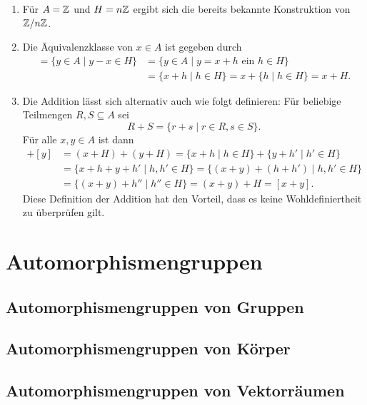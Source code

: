 \begin{bem}
 \begin{enumerate}[leftmargin=*]
  \item
   Für $A = \mathbb{Z}$ und $H = n\mathbb{Z}$ ergibt sich die bereits bekannte Konstruktion von $\mathbb{Z}/n\mathbb{Z}$.
  \item
   Die Äquivalenzklasse von $x \in A$ ist gegeben durch
   \begin{align*}
    [x]
    = \{y \in A \mid y-x \in H\}
    &= \{y \in A \mid \text{$y = x + h$ ein $h \in H$}\} \\
    &= \{x+h \mid h \in H\}
    = x + \{h \mid h \in H\}
    = x + H.
   \end{align*}
  \item
   Die Addition lässt sich alternativ auch wie folgt definieren: Für beliebige Teilmengen $R, S \subseteq A$ sei
   \[
    R + S = \{r+s \mid r \in R, s \in S\}.
   \]
   Für alle $x,y \in A$ ist dann
   \begin{align*}
    [x] + [y]
    &= (x+H) + (y+H)
    = \{x+h \mid h \in H\} + \{y+h' \mid h' \in H\} \\
    &= \{x+h+y+h' \mid h, h' \in H\}
    = \{(x+y)+(h+h') \mid h,h' \in H\} \\
    &= \{(x+y)+h'' \mid h'' \in H\}
    = (x+y)+H
    = [x+y].
   \end{align*}
   Diese Definition der Addition hat den Vorteil, dass es keine Wohldefiniertheit zu überprüfen gilt.
 \end{enumerate}
\end{bem}





\section{Automorphismengruppen}


\subsection{Automorphismengruppen von Gruppen}


\subsection{Automorphismengruppen von Körper}


\subsection{Automorphismengruppen von Vektorräumen}



